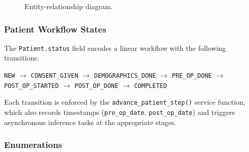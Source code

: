 \documentclass[12pt,a4paper]{article}
\begin{document}
\begin{figure}[H]
\caption{Entity-relationship diagram.}
\label{fig:er}
\end{figure}

\subsubsection{Patient Workflow States}

The \texttt{Patient.status} field encodes a linear workflow with the following
transitions:

\begin{center}
\small
\texttt{NEW} $\rightarrow$
\texttt{CONSENT\_GIVEN} $\rightarrow$
\texttt{DEMOGRAPHICS\_DONE} $\rightarrow$
\texttt{PRE\_OP\_DONE} $\rightarrow$
\texttt{POST\_OP\_STARTED} $\rightarrow$
\texttt{POST\_OP\_DONE} $\rightarrow$
\texttt{COMPLETED}
\end{center}

Each transition is enforced by the \texttt{advance\_patient\_step()} service
function, which also records timestamps (\texttt{pre\_op\_date},
\texttt{post\_op\_date}) and triggers asynchronous inference tasks at the
appropriate stages.

\subsubsection{Enumerations}
\end{document}
